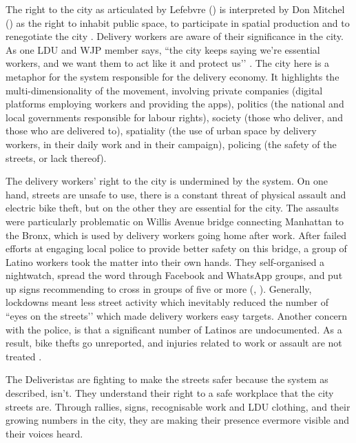\documentclass{article}
\begin{document}
The right to the city as articulated by Lefebvre (\citeyear{lefebvre1995writings}) is interpreted by Don Mitchel (\citeyear{mitchell2003right}) as the right to inhabit public space, to participate in spatial production and to renegotiate the city \parencite{lee2018delivering}. Delivery workers are aware of their significance in the city. As one LDU and WJP member says, ``the city keeps saying we’re essential workers, and we want them to act like it and protect us’’ \parencite{ldutestimonials}. The city here is a metaphor for the system responsible for the delivery economy. It highlights the multi-dimensionality of the movement, involving private companies (digital platforms employing workers and providing the apps), politics (the national and local governments responsible for labour rights), society (those who deliver, and those who are delivered to), spatiality (the use of urban space by delivery workers, in their daily work and in their campaign), policing (the safety of the streets, or lack thereof).

The delivery workers’ right to the city is undermined by the system. On one hand, streets are unsafe to use, there is a constant threat of physical assault and electric bike theft, but on the other they are essential for the city. The assaults were particularly problematic on Willis Avenue bridge connecting Manhattan to the Bronx, which is used by delivery workers going home after work. After failed efforts at engaging local police to provide better safety on this bridge, a group of Latino workers took the matter into their own hands. They self-organised a nightwatch, spread the word through Facebook and WhatsApp groups, and put up signs recommending to cross in groups of five or more (\parencite{vox2021}, \parencite{curbed2021}). Generally, lockdowns meant less street activity which inevitably reduced the number of ``eyes on the streets’’ \parencite{jacobs2007uses} which made delivery workers easy targets.
Another concern with the police, is that a significant number of Latinos are undocumented. As a result, bike thefts go unreported, and injuries related to work or assault are not treated \parencite{brictv}.

The Deliveristas are fighting to make the streets safer because the system as described, isn't. They understand their right to a safe workplace that the city streets are. Through rallies, signs, recognisable work and LDU clothing, and their growing numbers in the city, they are making their presence evermore visible and their voices heard.
\end{document}
